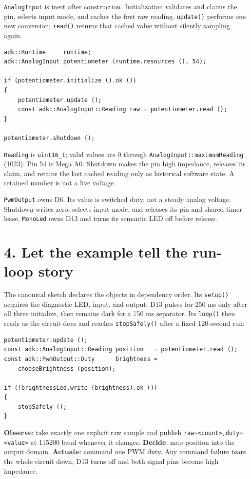 \documentclass[11pt]{article}
\begin{document}
\texttt{AnalogInput} is inert after construction. Initialization validates and
claims the pin, selects input mode, and caches the first raw reading.
\texttt{update()} performs one new conversion; \texttt{read()} returns that
cached value without silently sampling again.

\begin{lstlisting}[style=adkcpp]
adk::Runtime     runtime;
adk::AnalogInput potentiometer (runtime.resources (), 54);

if (potentiometer.initialize ().ok ())
{
    potentiometer.update ();
    const adk::AnalogInput::Reading raw = potentiometer.read ();
}

potentiometer.shutdown ();
\end{lstlisting}

\texttt{Reading} is \texttt{uint16\_t}; valid values are 0 through
\texttt{AnalogInput::maximumReading} (1023). Pin 54 is Mega A0. Shutdown makes
the pin high impedance, releases its claim, and retains the last cached reading
only as historical software state. A retained number is not a live voltage.

\texttt{PwmOutput} owns D6. Its value is switched duty, not a steady analog
voltage. Shutdown writes zero, selects input mode, and releases its pin and
shared timer lease. \texttt{MonoLed} owns D13 and turns its semantic LED off
before release.

\section*{4. Let the example tell the run-loop story}

The canonical sketch declares the objects in dependency order. Its
\texttt{setup()} acquires the diagnostic LED, input, and output. D13 pulses
for 250 ms only after all three initialize, then remains dark for a 750 ms
separator. Its \texttt{loop()} then reads as the circuit does and reaches
\texttt{stopSafely()} after a fixed 120-second run:

\begin{lstlisting}[style=adkcpp]
potentiometer.update ();
const adk::AnalogInput::Reading position   = potentiometer.read ();
const adk::PwmOutput::Duty      brightness =
    chooseBrightness (position);

if (!brightnessLed.write (brightness).ok ())
{
    stopSafely ();
}
\end{lstlisting}

\textbf{Observe}: take exactly one explicit raw sample and publish
\texttt{raw=<count>,duty=<value>} at 115200 baud whenever it changes.
\textbf{Decide}: map position into the output domain.
\textbf{Actuate}: command one PWM duty. Any command failure tears the whole
circuit down; D13 turns off and both signal pins become high impedance.
\end{document}
